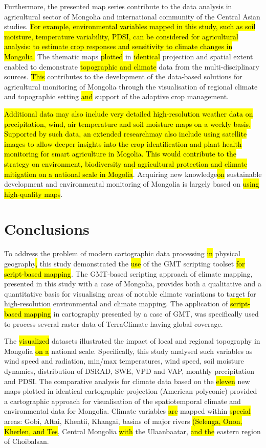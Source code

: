 \documentclass[geosciences,article,submit,pdftex,moreauthors]{Definitions/mdpi}
\begin{document}
Furthermore, the presented map series contribute to the data analysis in agricultural sector of Mongolia and international community of the Central Asian studies. \hl{For example, environmental variables mapped in this study, such as soil moisture, temperature variability, PDSI, can be considered for agricultural analysis: to estimate crop responses and sensitivity to climate changes in Mongolia.} The thematic maps \hl{plotted} in \hl{identical} projection and spatial extent enabled to demonstrate \hl{topographic and climate} data from the multi-disciplinary sources. \hl{This} contributes to the development of the data-based solutions for agricultural monitoring of Mongolia through the visualisation of regional climate and topographic setting \hl{and} support of the adaptive crop management. 

\hl{Additional data may also include very detailed high-resolution weather data on precipitation, wind, air temperature and soil moisture maps on a weekly basis. Supported by such data, an extended researchmay also include using satellite images to allow deeper insights into the crop identification and plant health monitoring for smart agriculture in Mogolia. This would contribute to the strategy on environment, biodiversity and agricultural protection and climate mitigation on a national scale in Mogolia}. Acquiring new knowledge\hl{on} sustainable development and environmental monitoring of Mongolia is largely based on \hl{using high-quality maps}.

\section{Conclusions}

To address the problem of modern cartographic data processing \hl{in} physical geography\hl{,} this study demonstrated the \hl{use} of the GMT scripting toolset \hl{for script-based mapping}. The GMT-based scripting approach of climate mapping, presented in this study with a case of Mongolia, provides both a qualitative and a quantitative basis for visualising areas of notable climate variations to target for high-resolution environmental and climate mapping. The application of \hl{script-based mapping} in cartography presented by a case of GMT, was specifically used to process several raster data of TerraClimate having global coverage. 

The \hl{visualized} datasets illustrated the impact of local and regional topography in Mongolia \hl{on a} national scale. Specifically, this study analysed such variables as wind speed and radiation, min/max temperatures, wind speed, soil moisture dynamics, distribution of DSRAD, SWE, VPD and VAP, monthly precipitation and PDSI. The comparative analysis for climate data based on the \hl{eleven} new maps plotted in identical cartographic projection (American polyconic) provided a cartographic approach for visualisation of the spatiotemporal climate and environmental data for Mongolia. Climate variables \hl{are} mapped within \hl{special} areas: Gobi, Altai, Khentii, Khangai, basins of major rivers \hl{(Selenga, Onon, Kherlen, and Tes}, Central Mongolia \hl{with} the Ulaanbaatar, \hl{and the} eastern region of Choibalsan.
\end{document}
